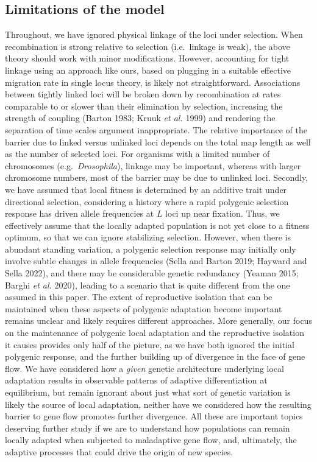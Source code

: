 \documentclass[
  11pt,
]{article}
\begin{document}
\hypertarget{limitations-of-the-model}{%
\subsection{Limitations of the model}\label{limitations-of-the-model}}

Throughout, we have ignored physical linkage of the loci under
selection. When recombination is strong relative to selection
(i.e.~linkage is weak), the above theory should work with minor
modifications. However, accounting for tight linkage using an approach
like ours, based on plugging in a suitable effective migration rate in
single locus theory, is likely not straightforward. Associations between
tightly linked loci will be broken down by recombination at rates
comparable to or slower than their elimination by selection, increasing
the strength of coupling (Barton 1983; Kruuk \emph{et al.} 1999) and
rendering the separation of time scales argument inappropriate. The
relative importance of the barrier due to linked versus unlinked loci
depends on the total map length as well as the number of selected loci.
For organisms with a limited number of chromosomes
(e.g.~\emph{Drosophila}), linkage may be important, whereas with larger
chromosome numbers, most of the barrier may be due to unlinked loci.
Secondly, we have assumed that local fitness is determined by an
additive trait under directional selection, considering a history where
a rapid polygenic selection response has driven allele frequencies at
\(L\) loci up near fixation. Thus, we effectively assume that the
locally adapted population is not yet close to a fitness optimum, so
that we can ignore stabilizing selection. However, when there is
abundant standing variation, a polygenic selection response may
initially only involve subtle changes in allele frequencies (Sella and
Barton 2019; Hayward and Sella 2022), and there may be considerable
genetic redundancy (Yeaman 2015; Barghi \emph{et al.} 2020), leading to
a scenario that is quite different from the one assumed in this paper.
The extent of reproductive isolation that can be maintained when these
aspects of polygenic adaptation become important remains unclear and
likely requires different approaches. More generally, our focus on the
maintenance of polygenic local adaptation and the reproductive isolation
it causes provides only half of the picture, as we have both ignored the
initial polygenic response, and the further building up of divergence in
the face of gene flow. We have considered how a \emph{given} genetic
architecture underlying local adaptation results in observable patterns
of adaptive differentiation at equilibrium, but remain ignorant about
just what sort of genetic variation is likely the source of local
adaptation, neither have we considered how the resulting barrier to gene
flow promotes further divergence. All these are important topics
deserving further study if we are to understand how populations can
remain locally adapted when subjected to maladaptive gene flow, and,
ultimately, the adaptive processes that could drive the origin of new
species.
\end{document}

